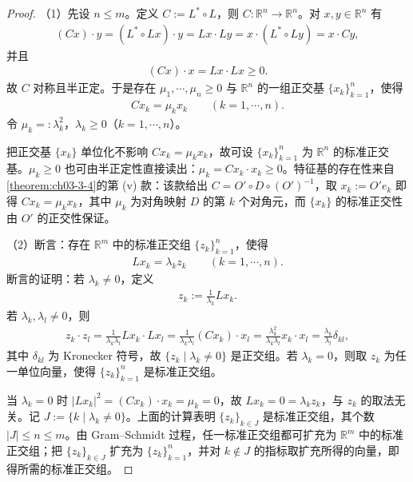 \documentclass[../../main.tex]{subfiles}%
\begin{document}
\begin{proof}
（1）先设 $n\leqslant m$。定义 $C:=L^*\circ L$，则 $C:\mathbb{R}^n\to\mathbb{R}^n$。对 $x,y\in\mathbb{R}^n$ 有
\begin{align*}
(Cx)\cdot y=(L^*\circ Lx)\cdot y=Lx\cdot Ly=x\cdot(L^*\circ Ly)=x\cdot Cy,
\end{align*}
并且
\begin{align*}
(Cx)\cdot x=Lx\cdot Lx\geqslant0.
\end{align*}
故 $C$ 对称且半正定。于是存在 $\mu_1,\cdots,\mu_n\geqslant0$ 与 $\mathbb{R}^n$ 的一组正交基 $\{x_k\}_{k=1}^n$，使得
\begin{align*}
Cx_k=\mu_kx_k\qquad(k=1,\cdots,n).
\end{align*}
令 $\mu_k=:\lambda_k^2$，$\lambda_k\geqslant0$（$k=1,\cdots,n$）。

把正交基 $\{x_k\}$ 单位化不影响 $Cx_k=\mu_kx_k$，故可设 $\{x_k\}_{k=1}^n$ 为 $\mathbb{R}^n$ 的标准正交基。$\mu_k\geqslant0$ 也可由半正定性直接读出：$\mu_k=Cx_k\cdot x_k\geqslant0$。特征基的存在性来自\cref{theorem:ch03-3-4}的第 (v) 款：该款给出 $C=O'\circ D\circ(O')^{-1}$，取 $x_k:=O'e_k$ 即得 $Cx_k=\mu_kx_k$，其中 $\mu_k$ 为对角映射 $D$ 的第 $k$ 个对角元，而 $\{x_k\}$ 的标准正交性由 $O'$ 的正交性保证。%

（2）断言：存在 $\mathbb{R}^m$ 中的标准正交组 $\{z_k\}_{k=1}^n$，使得
\begin{align*}
Lx_k=\lambda_kz_k\qquad(k=1,\cdots,n).
\end{align*}
断言的证明：若 $\lambda_k\neq0$，定义
\begin{align*}
z_k:=\frac{1}{\lambda_k}Lx_k.
\end{align*}
若 $\lambda_k,\lambda_l\neq0$，则
\begin{align*}
z_k\cdot z_l
=\frac{1}{\lambda_k\lambda_l}Lx_k\cdot Lx_l
=\frac{1}{\lambda_k\lambda_l}(Cx_k)\cdot x_l
=\frac{\lambda_k^2}{\lambda_k\lambda_l}x_k\cdot x_l
=\frac{\lambda_k}{\lambda_l}\delta_{kl},
\end{align*}
其中 $\delta_{kl}$ 为 Kronecker 符号，故 $\{z_k\mid\lambda_k\neq0\}$ 是正交组。若 $\lambda_k=0$，则取 $z_k$ 为任一单位向量，使得 $\{z_k\}_{k=1}^n$ 是标准正交组。

当 $\lambda_k=0$ 时 $\lvert Lx_k\rvert^2=(Cx_k)\cdot x_k=\mu_k=0$，故 $Lx_k=0=\lambda_kz_k$，与 $z_k$ 的取法无关。记 $J:=\{k\mid\lambda_k\neq0\}$。上面的计算表明 $\{z_k\}_{k\in J}$ 是标准正交组，其个数 $\lvert J\rvert\leqslant n\leqslant m$。由 Gram--Schmidt 过程，任一标准正交组都可扩充为 $\mathbb{R}^m$ 中的标准正交组；把 $\{z_k\}_{k\in J}$ 扩充为 $\{z_k\}_{k=1}^n$，并对 $k\notin J$ 的指标取扩充所得的向量，即得所需的标准正交组。


\end{proof}
\end{document}
